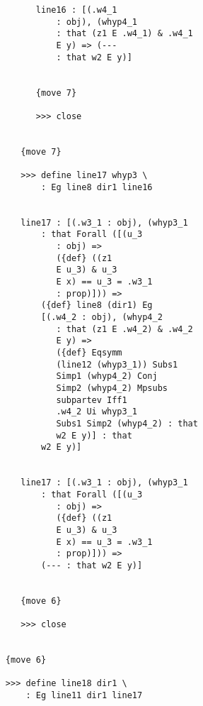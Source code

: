 \documentclass[12pt]{article}
\begin{document}
\begin{verbatim}
                        line16 : [(.w4_1 
                            : obj), (whyp4_1 
                            : that (z1 E .w4_1) & .w4_1 
                            E y) => (--- 
                            : that w2 E y)]


                        {move 7}

                        >>> close


                     {move 7}

                     >>> define line17 whyp3 \
                         : Eg line8 dir1 line16


                     line17 : [(.w3_1 : obj), (whyp3_1 
                         : that Forall ([(u_3 
                            : obj) => 
                            ({def} ((z1 
                            E u_3) & u_3 
                            E x) == u_3 = .w3_1 
                            : prop)])) => 
                         ({def} line8 (dir1) Eg 
                         [(.w4_2 : obj), (whyp4_2 
                            : that (z1 E .w4_2) & .w4_2 
                            E y) => 
                            ({def} Eqsymm 
                            (line12 (whyp3_1)) Subs1 
                            Simp1 (whyp4_2) Conj 
                            Simp2 (whyp4_2) Mpsubs 
                            subpartev Iff1 
                            .w4_2 Ui whyp3_1 
                            Subs1 Simp2 (whyp4_2) : that 
                            w2 E y)] : that 
                         w2 E y)]


                     line17 : [(.w3_1 : obj), (whyp3_1 
                         : that Forall ([(u_3 
                            : obj) => 
                            ({def} ((z1 
                            E u_3) & u_3 
                            E x) == u_3 = .w3_1 
                            : prop)])) => 
                         (--- : that w2 E y)]


                     {move 6}

                     >>> close


                  {move 6}

                  >>> define line18 dir1 \
                      : Eg line11 dir1 line17



\end{verbatim}
\end{document}
